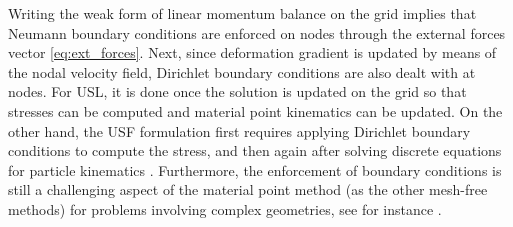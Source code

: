 Writing the weak form of linear momentum balance on the grid implies that Neumann boundary conditions are enforced on nodes through the external forces vector \eqref{eq:ext_forces}.
Next, since deformation gradient is updated by means of the nodal velocity field, Dirichlet boundary conditions are also dealt with at nodes.
For USL, it is done once the solution is updated on the grid so that stresses can be computed and material point kinematics can be updated.
On the other hand, the USF formulation first requires applying Dirichlet boundary conditions to compute the stress, and then again after solving discrete equations for particle kinematics \cite{USF_USL}.
Furthermore, the enforcement of boundary conditions is still a challenging aspect of the material point method (as the other mesh-free methods) for problems involving complex geometries, see for instance \cite{Bcs_MPM}.

